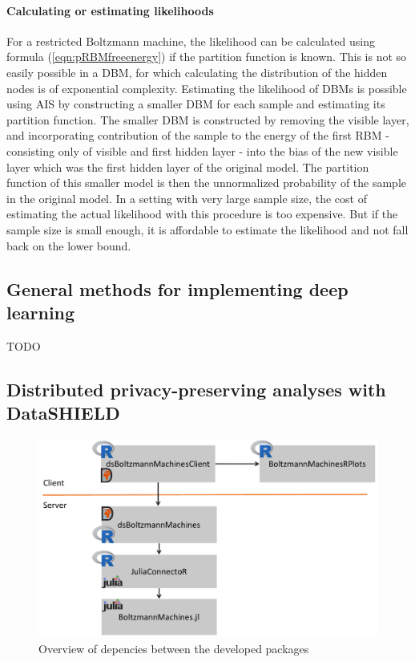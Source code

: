 \documentclass[12pt]{article}
\begin{document}
\paragraph{Calculating or estimating likelihoods} %
For a restricted Boltzmann machine, the likelihood can be calculated using formula (\ref{eqn:pRBMfreeenergy}) if the partition function is known. This is not so easily possible in a DBM, for which calculating the distribution of the hidden nodes is of exponential complexity.
Estimating the likelihood of DBMs is possible using AIS by constructing a smaller DBM for each sample and estimating its partition function.
The smaller DBM is constructed by removing the visible layer, and incorporating contribution of the sample to the energy of the first RBM - consisting only of visible and first hidden layer - into the bias of the new visible layer which was the first hidden layer of the original model.
The partition function of this smaller model is then the unnormalized probability of the sample in the original model.
In a setting with very large sample size, the cost of estimating the actual likelihood with this procedure is too expensive. But if the sample size is small enough, it is affordable to estimate the likelihood and not fall back on the lower bound.

\subsection{General methods for implementing deep learning}
TODO

\subsection{Distributed privacy-preserving analyses with DataSHIELD}
\begin{figure}[h]
   \centering
   \includegraphics[scale=0.5]{images/dsBoltzmannMachinesOverview.pdf}
   \caption{Overview of depencies between the developed packages}
 \end{figure}
 
\end{document}

